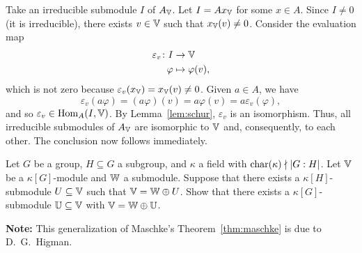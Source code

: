 \begin{solution}
    Take an irreducible submodule $I$ of $A_\mathbb V$. Let $I=Ax_\mathbb V$ for some $x\in A$. Since $I\ne0$ (it is irreducible), there exists $v\in\mathbb V$ such that $x_\mathbb V(v)\ne0$. Consider the evaluation map
    \begin{align*}
        \varepsilon_v\colon I&\to\mathbb V\\
        \varphi&\mapsto\varphi(v),
    \end{align*}
    which is not zero because $\varepsilon_v(x_\mathbb V)=x_\mathbb V(v)\ne0$. Given $a\in A$, we have
    $$
        \varepsilon_v(a\varphi)=(a\varphi)(v)
            =a\varphi(v)=a\varepsilon_v(\varphi),
    $$
    and so $\varepsilon_v\in{\rm Hom}_A(I,\mathbb V)$. By Lemma~\ref{lem:schur}, $\varepsilon_v$ is an isomorphism. Thus, all irreducible submodules of $A_\mathbb V$ are isomorphic to $\mathbb V$ and, consequently, to each other. The conclusion now follows immediately.
\end{solution}

\begin{probl}
    Let\/ $G$ be a group,\/ $H \subseteq G$ a subgroup, and\/ $\kappa$ a field with\/ $\operatorname{char}(\kappa)\nmid|G : H|$. Let\/ $\mathbb V$ be a\/ $\kappa[G]$-module and\/ $\mathbb W$ a submodule. Suppose that there exists a\/ $\kappa[H]$-submodule\/ $U \subseteq \mathbb V$ such that\/ $\mathbb V = \mathbb W\oplus U$. Show that there exists a\/ $\kappa[G]$-submodule\/ $\mathbb U \subseteq \mathbb V$ with\/ $\mathbb V = \mathbb W\oplus\mathbb U$.

    \textrm{\rm\textbf{Note:} This generalization of Maschke’s Theorem~\ref{thm:maschke} is due to D.~G.~Higman.}
\end{probl}

